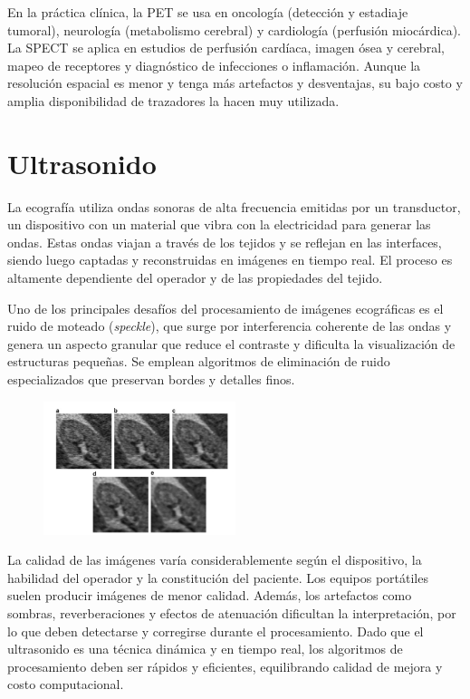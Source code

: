 En la práctica clínica, la PET se usa en oncología (detección y estadiaje tumoral), neurología (metabolismo cerebral) y cardiología (perfusión miocárdica). La SPECT se aplica en estudios de perfusión cardíaca, imagen ósea y cerebral, mapeo de receptores y diagnóstico de infecciones o inflamación. Aunque la resolución espacial es menor y tenga más artefactos y desventajas, su bajo costo y amplia disponibilidad de trazadores la hacen muy utilizada.

\section{Ultrasonido}

La ecografía utiliza ondas sonoras de alta frecuencia emitidas por un transductor, un dispositivo con un material que vibra con la electricidad para generar las ondas. Estas ondas viajan a través de los tejidos y se reflejan en las interfaces, siendo luego captadas y reconstruidas en imágenes en tiempo real. El proceso es altamente dependiente del operador y de las propiedades del tejido.

Uno de los principales desafíos del procesamiento de imágenes ecográficas es el ruido de moteado (\textit{speckle}), que surge por interferencia coherente de las ondas y genera un aspecto granular que reduce el contraste y dificulta la visualización de estructuras pequeñas. Se emplean algoritmos de eliminación de ruido especializados que preservan bordes y detalles finos.

\begin{figure}[h]
\centering
\includegraphics[width = 0.5\textwidth]{figs/speckle.png}
\end{figure}

La calidad de las imágenes varía considerablemente según el dispositivo, la habilidad del operador y la constitución del paciente. Los equipos portátiles suelen producir imágenes de menor calidad. Además, los artefactos como sombras, reverberaciones y efectos de atenuación dificultan la interpretación, por lo que deben detectarse y corregirse durante el procesamiento. Dado que el ultrasonido es una técnica dinámica y en tiempo real, los algoritmos de procesamiento deben ser rápidos y eficientes, equilibrando calidad de mejora y costo computacional.


